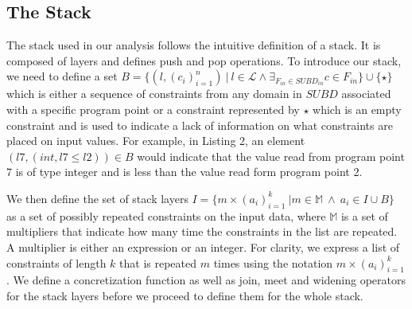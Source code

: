 \documentclass[]{report}
\begin{document}
\subsection{The Stack} \label{stack}

The stack used in our analysis follows the intuitive definition of a stack. It is composed of layers and defines push and pop operations. To introduce our stack, we need to define a set $B = \lbrace (l, (c_{i})_{i=1}^{n})\ \vert \ l \in \mathcal{L} \wedge \exists_{F_{in} \in SUBD_{in}} c \in F_{in} \rbrace \cup \lbrace \star \rbrace$ which is either a sequence of constraints from any domain in $SUBD$ associated with a specific program point or a constraint represented by $ \star $ which is an empty constraint and is used to indicate a lack of information on what constraints are placed on input values. For example, in Listing 2, an element $(l7, (int, l7 \leq l2)) \in B$ would indicate that the value read from program point 7 is of type integer and is less than the value read form program point 2.

We then define the set of stack layers $I  = \lbrace  m \times (a_{i})_{i=1}^{k}\ \vert m \in \mathbb{M}\ \wedge \ a_{i} \in I \cup B \rbrace$ as a set of possibly repeated constraints on the input data, where $ \mathbb{M} $ is a set of multipliers that indicate how many time the constraints in the list are repeated. A multiplier is either an expression or an integer. For clarity, we express a list of constraints of length $ k $ that is repeated $ m $ times using the notation $ m \times (a_{i})_{i=1}^{k} $. We define a concretization function as well as join, meet and widening operators for the stack layers before we proceed to define them for the whole stack. 
\end{document}
